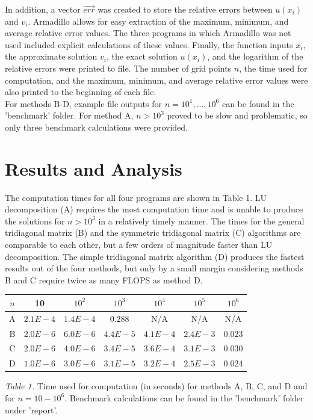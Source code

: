 \documentclass[prb,aps,twocolumn,showpacs,10pt]{revtex4-1}
\begin{document}
In addition, a vector $\vec{err}$ was created to store the relative errors between $u(x_i)$ and $v_i$. Armadillo allows for easy extraction of the maximum, minimum, and average relative error values. The three programs in which Armadillo was not used included explicit calculations of these values. Finally, the function inputs $x_i$, the approximate solution $v_i$, the exact solution $u(x_i)$, and the logarithm of the relative errors were printed to file. The number of grid points $n$, the time used for computation, and the maximum, minimum, and average relative error values were also printed to the beginning of each file.\\

For methods B-D, example file outputs for $n=10^1,...,10^6$ can be found in the 'benchmark' folder. For method A, $n>10^3$ proved to be slow and problematic, so only three benchmark calculations were provided. 

\section{Results and Analysis}

The computation times for all four programs are shown in Table 1. LU decomposition (A) requires the most computation time and is unable to produce the solutions for $n>10^3$ in a relatively timely manner. The times for the general tridiagonal matrix (B) and the symmetric tridiagonal matrix (C) algorithms are comparable to each other, but a few orders of magnitude faster than LU decomposition. The simple tridiagonal matrix algorithm (D) produces the fastest results out of the four methods, but only by a small margin considering methods B and C require twice as many FLOPS as method D. 

\begin{center}
\begin{tabular}{|c||c|c|c|c|c|c|}
\hline
$n$&10&$10^2$&$10^3$&$10^4$&$10^5$&$10^6$\\
\hline
\hline
A & $2.1E-4$ &$1.4E-4$&$0.288$& N/A & N/A & N/A\\
\hline
B & $2.0E-6$ &$6.0E-6$&$4.4E-5$& $4.1E-4$ & $2.4E-3$ & $0.023$\\
\hline
C & $2.0E-6$ &$4.0E-6$&$3.4E-5$& $3.6E-4$ & $3.1E-3$ & $0.030$\\
\hline
D & $1.0E-6$ &$3.0E-6$&$3.1E-5$& $3.2E-4$ & $2.5E-3$ & $0.024$\\
\hline 
\end{tabular}
\vspace{2mm}

\textit{Table 1.} Time used for computation (in seconds) for methods A, B, C, and D and for $n=10-10^6$. Benchmark calculations can be found in the 'benchmark' folder under 'report'.
\end{center}
\end{document}
